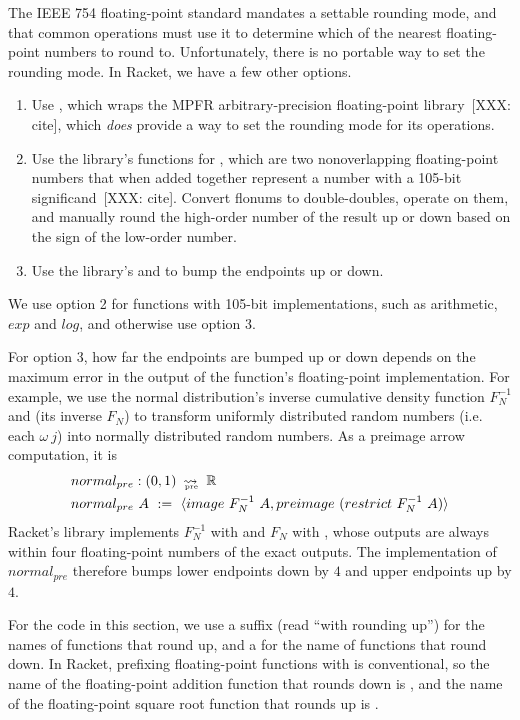 The IEEE 754 floating-point standard mandates a settable rounding mode, and that common operations must use it to determine which of the nearest floating-point numbers to round to.
Unfortunately, there is no portable way to set the rounding mode.
In Racket, we have a few other options.
\begin{enumerate}
	\item Use , which wraps the MPFR arbitrary-precision floating-point library~[XXX: cite], which \emph{does} provide a way to set the rounding mode for its operations.
	\item Use the  library's functions for , which are two nonoverlapping floating-point numbers that when added together represent a number with a 105-bit significand~[XXX: cite].
	Convert flonums to double-doubles, operate on them, and manually round the high-order number of the result up or down based on the sign of the low-order number.
	\item Use the  library's  and  to bump the endpoints up or down.
\end{enumerate}
We use option 2 for functions with 105-bit implementations, such as arithmetic, $exp$ and $log$, and otherwise use option 3.

For option 3, how far the endpoints are bumped up or down depends on the maximum error in the output of the function's floating-point implementation.
For example, we use the normal distribution's inverse cumulative density function $F_N^{-1}$ and (its inverse $F_N$) to transform uniformly distributed random numbers (i.e. each $\omega~j$) into normally distributed random numbers.
As a preimage arrow computation, it is
\begin{equation}
\begin{aligned}
	&normal_{pre} : (0,1)~\operatorname{\rightsquigarrow_{\mspace{-20mu}_\mathrm{pre}}}~\mathbb{R} \\
	&normal_{pre}~A\ :=\ \langle{image~F_N^{-1}~A, preimage~(restrict~F_N^{-1}~A)}\rangle
\end{aligned}
\end{equation}
Racket's  library implements $F_N^{-1}$ with  and $F_N$ with , whose outputs are always within four floating-point numbers of the exact outputs.
The implementation of $normal_{pre}$ therefore bumps lower endpoints down by $4$ and upper endpoints up by $4$.

For the code in this section, we use a  suffix (read ``with rounding up'') for the names of functions that round up, and a  for the name of functions that round down.
In Racket, prefixing floating-point functions with  is conventional, so the name of the floating-point addition function that rounds down is , and the name of the floating-point square root function that rounds up is .

